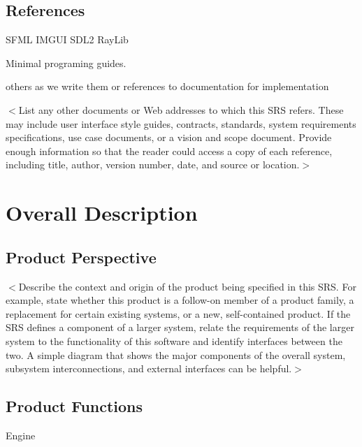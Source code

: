 \documentclass{scrreprt}
\begin{document}

\section{References}

SFML 
IMGUI
SDL2
RayLib

Minimal programing guides. 

others as we write them or references to documentation for implementation

$<$List any other documents or Web addresses to which this SRS refers. These may 
include user interface style guides, contracts, standards, system requirements 
specifications, use case documents, or a vision and scope document. Provide 
enough information so that the reader could access a copy of each reference, 
including title, author, version number, date, and source or location.$>$


\chapter{Overall Description}

\section{Product Perspective}



$<$Describe the context and origin of the product being specified in this SRS.  
For example, state whether this product is a follow-on member of a product 
family, a replacement for certain existing systems, or a new, self-contained 
product. If the SRS defines a component of a larger system, relate the 
requirements of the larger system to the functionality of this software and 
identify interfaces between the two. A simple diagram that shows the major 
components of the overall system, subsystem interconnections, and external 
interfaces can be helpful.$>$

\section{Product Functions}

Engine
\end{document}
